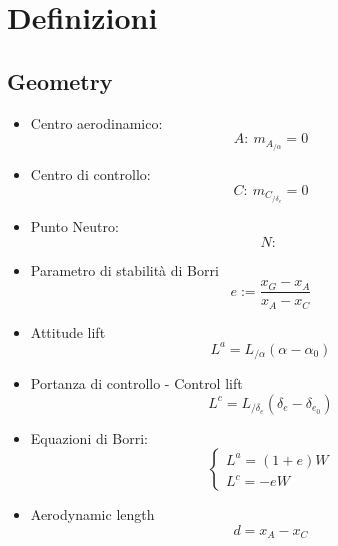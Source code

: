 \section{Definizioni}

\subsection{Geometry}
    \begin{itemize}
        \item Centro aerodinamico:
        \begin{equation}
           A: ~ m_{A_{/\alpha}} = 0
        \end{equation}
        \item Centro di controllo:
        \begin{equation}
           C: ~ m_{C_{/\delta_e}} = 0
        \end{equation}
        \item Punto Neutro:
        \begin{equation}
            N: ~
        \end{equation}
        \item Parametro di stabilità di Borri
        \begin{equation}
            e:=\frac{x_G-x_A}{x_A-x_C}
        \end{equation}
        \item Attitude lift
        \begin{equation}
            L^a = L_{/\alpha} (\alpha-\alpha_0)
        \end{equation}
        \item Portanza di controllo - Control lift
        \begin{equation}
            L^c = L_{/\delta_e} (\delta_e-\delta_{e_0})  
        \end{equation}
        \item Equazioni di Borri:
        \begin{equation}
            \begin{cases}
                L^a = (1+e)W\\
                L^c = -eW
            \end{cases}
        \end{equation}
        \item Aerodynamic length
        \begin{equation}
            d = x_A-x_C
        \end{equation}
    \end{itemize}
    
